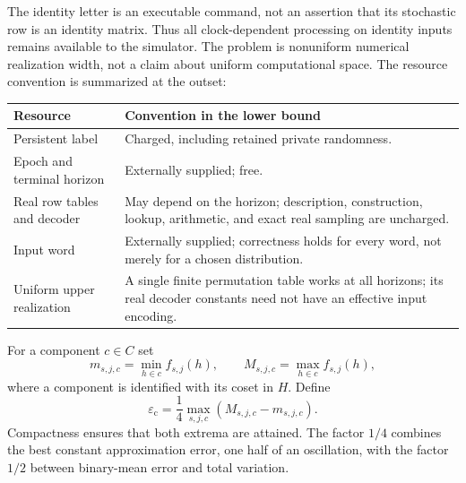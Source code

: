 \documentclass[11pt]{amsart}
\numberwithin{equation}{section}
\theoremstyle{definition}
\theoremstyle{remark}
\newcommand{\epsc}{\varepsilon_{\mathrm c}}
\begin{document}
The identity letter is an executable command, not an assertion that its stochastic row is an identity matrix. Thus all clock-dependent processing on identity inputs remains available to the simulator. The problem is nonuniform numerical realization width, not a claim about uniform computational space. The resource convention is summarized at the outset:
\begin{center}\small
\begin{tabular}{p{}p{}}
\toprule
Resource & Convention in the lower bound\\
\midrule
Persistent label & Charged, including retained private randomness.\\
Epoch and terminal horizon & Externally supplied; free.\\
Real row tables and decoder & May depend on the horizon; description, construction, lookup, arithmetic, and exact real sampling are uncharged.\\
Input word & Externally supplied; correctness holds for every word, not merely for a chosen distribution.\\
Uniform upper realization & A single finite permutation table works at all horizons; its real decoder constants need not have an effective input encoding.\\
\bottomrule
\end{tabular}
\end{center}
For a component $c\in C$ set
\[
 m_{s,j,c}=\min_{h\in c} f_{s,j}(h),\qquad
 M_{s,j,c}=\max_{h\in c} f_{s,j}(h),
\]
where a component is identified with its coset in $H$. Define
\begin{equation}\label{eq:critical53}
 \epsc=\frac14\max_{s,j,c}(M_{s,j,c}-m_{s,j,c}).
\end{equation}
Compactness ensures that both extrema are attained. The factor $1/4$ combines the best constant approximation error, one half of an oscillation, with the factor $1/2$ between binary-mean error and total variation.
\end{document}
